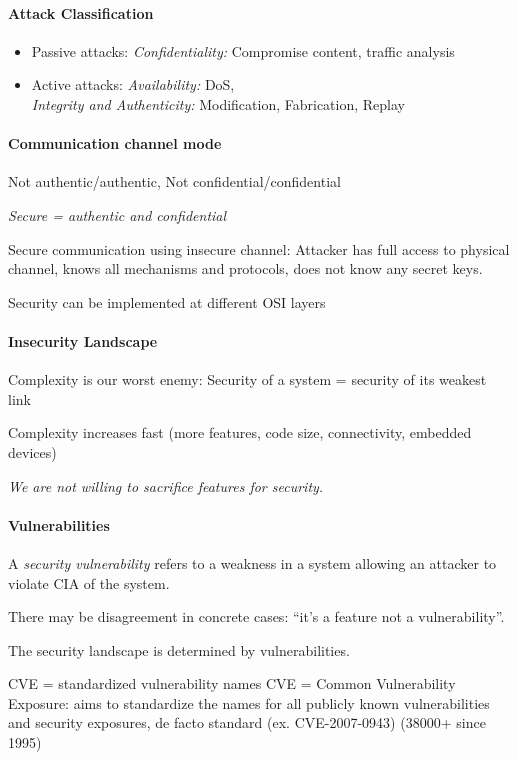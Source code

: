 \paragraph{Attack Classification}
\begin{itemize}
\item Passive attacks: \emph{Confidentiality:} Compromise content, traffic analysis
\item Active attacks: \emph{Availability:} DoS, \\ \emph{Integrity and Authenticity:} Modification, Fabrication, Replay
\end{itemize}

\paragraph{Communication channel mode}
Not authentic/authentic, Not confidential/confidential

\emph{Secure = authentic and confidential}

Secure communication using insecure channel: Attacker has full
access to physical channel, knows all mechanisms and protocols,
does not know any secret keys.

Security can be implemented at different OSI layers

\paragraph{Insecurity Landscape}
Complexity is our worst enemy: Security of a
system = security of its weakest link

Complexity increases fast (more features,
code size, connectivity, embedded devices)

\emph{We are not willing to sacrifice features for
security.}

\paragraph{Vulnerabilities} 
A \emph{security vulnerability} refers to a weakness
in a system allowing an attacker to violate
CIA of the system.

There may be disagreement in concrete
cases: ``it's a feature not a vulnerability''.

The security landscape is determined by
vulnerabilities.

CVE = standardized vulnerability names
CVE = Common Vulnerability Exposure:
aims to standardize the names for all
publicly known vulnerabilities and security
exposures, de facto standard (ex.
CVE-2007-0943) (38000+ since 1995)

